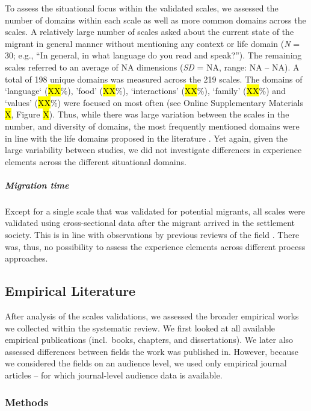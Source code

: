 To assess the situational focus within the validated scales, we assessed
the number of domains within each scale as well as more common domains
across the scales. A relatively large number of scales asked about the
current state of the migrant in general manner without mentioning any
context or life domain (\textit{N} = 30; e.g., ``In general, in what
language do you read and speak?''). The remaining scales referred to an
average of NA dimensions (\textit{SD} = NA, range: NA -- NA). A total of
198 unique domains was measured across the 219 scales. The domains of
`language` (\hl{XX}\%), 'food' (\hl{XX}\%), `interactions' (\hl{XX}\%),
`family' (\hl{XX}\%) and `values' (\hl{XX}\%) were focused on most often
(see Online Supplementary Materials \hl{X}, Figure \hl{X}). Thus, while
there was large variation between the scales in the number, and
diversity of domains, the most frequently mentioned domains were in line
with the life domains proposed in the literature
\citep[e.g.,][]{Arends-Toth2007}. Yet again, given the large variability
between studies, we did not investigate differences in experience
elements across the different situational domains.

\subparagraph{Migration time}

Except for a single scale that was validated for potential migrants, all
scales were validated using cross-sectional data after the migrant
arrived in the settlement society. This is in line with observations by
previous reviews of the field \citep[e.g.,][]{Brown2011}. There was,
thus, no possibility to assess the experience elements across different
process approaches.

\subsection{Empirical Literature}

After analysis of the scales validations, we assessed the broader
empirical works we collected within the systematic review. We first
looked at all available empirical publications (incl.~books, chapters,
and dissertations). We later also assessed differences between fields
the work was published in. However, because we considered the fields on
an audience level, we used only empirical journal articles -- for which
journal-level audience data is available.

\subsubsection{Methods}

